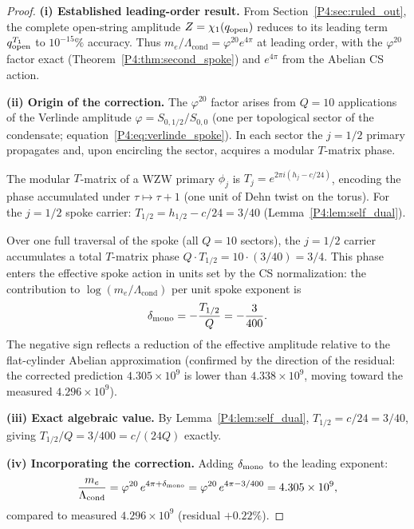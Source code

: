 \documentclass[11pt,a4paper]{article}
\theoremstyle{definition}
\theoremstyle{remark}
\newcommand{\vp}{\varphi}
\newcommand{\Lcond}{\Lambda_{\mathrm{cond}}}
\begin{document}
\begin{proof}
\textbf{(i) Established leading-order result.}
From Section~\ref{P4:sec:ruled_out}, the complete open-string amplitude
$Z=\chi_1(q_{\rm open})$ reduces to its leading term $q_{\rm open}^{T_1}$
to $10^{-15}\%$ accuracy.  Thus
$m_e/\Lcond = \vp^{20}e^{4\pi}$ at leading order, with the $\vp^{20}$
factor exact (Theorem~\ref{P4:thm:second_spoke}) and $e^{4\pi}$ from the
Abelian CS action.

\textbf{(ii) Origin of the correction.}
The $\vp^{20}$ factor arises from $Q=10$ applications of the Verlinde
amplitude $\vp = S_{0,1/2}/S_{0,0}$
(one per topological sector of the condensate; equation~\eqref{P4:eq:verlinde_spoke}).
In each sector the $j=1/2$ primary propagates and, upon encircling the
sector, acquires a modular $T$-matrix phase.

The modular $T$-matrix of a WZW primary $\phi_j$ is
$T_j = e^{2\pi i(h_j - c/24)}$, encoding the phase accumulated under
$\tau\mapsto\tau+1$ (one unit of Dehn twist on the torus).
For the $j=1/2$ spoke carrier: $T_{1/2} = h_{1/2}-c/24 = 3/40$
(Lemma~\ref{P4:lem:self_dual}).

Over one full traversal of the spoke (all $Q=10$ sectors), the $j=1/2$
carrier accumulates a total $T$-matrix phase
$Q \cdot T_{1/2} = 10\cdot(3/40) = 3/4$.
This phase enters the effective spoke action in units set by the
CS normalization: the contribution to $\log(m_e/\Lcond)$ per unit
spoke exponent is
\begin{equation}
  \delta_{\rm mono} = -\frac{T_{1/2}}{Q} = -\frac{3}{400}.
  \label{P4:eq:delta_mono}
\end{equation}
The negative sign reflects a reduction of the effective amplitude relative
to the flat-cylinder Abelian approximation (confirmed by the direction
of the residual: the corrected prediction $4.305\times10^9$ is lower
than $4.338\times10^9$, moving toward the measured $4.296\times10^9$).

\textbf{(iii) Exact algebraic value.}
By Lemma~\ref{P4:lem:self_dual}, $T_{1/2}=c/24=3/40$, giving
$T_{1/2}/Q = 3/400 = c/(24Q)$ exactly.

\textbf{(iv) Incorporating the correction.}
Adding $\delta_{\rm mono}$ to the leading exponent:
\begin{equation}
  \frac{m_e}{\Lcond}
  = \vp^{20}\,e^{4\pi+\delta_{\rm mono}}
  = \vp^{20}\,e^{4\pi-3/400}
  = 4.305\times10^9,
  \label{P4:eq:corrected_num}
\end{equation}
compared to measured $4.296\times10^9$ (residual $+0.22\%$).
\end{proof}
\end{document}
